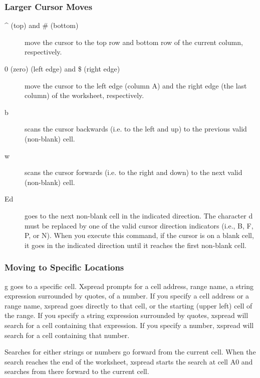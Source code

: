 \subsubsection*{Larger Cursor Moves}
\begin{description}
\item[ \^{ } (top) and \# (bottom)]{ move the cursor to the top row and bottom row of
the current column, respectively.}

    \item[0 (zero) (left edge) and \$ (right edge)]{ move the cursor to the left edge
(column A) and the right edge (the last column) of the worksheet, 
respectively.}

    \item[b]{ scans the cursor backwards (i.e. to the left and up) to the previous 
valid (non-blank) cell.}

    \item[w]{ scans the cursor forwards (i.e. to the right and down) to the next valid 
(non-blank) cell.}

    \item[\ctrl Ed]{ goes to the next non-blank cell in the indicated direction.  The 
character d must be replaced by one of the valid cursor direction indicators 
(i.e., \ctrl B, \ctrl F, \ctrl P, or \ctrl N).  When you execute this 
  command, if the cursor is on 
a blank cell, it goes in the indicated direction until it reaches the first 
non-blank cell.}
\end{description}

\subsubsection*{Moving to Specific Locations}

    g goes to a specific cell.  Xspread prompts for a cell address, range 
name, a string expression surrounded by quotes, of a number.  If you specify a 
cell address or a range name, xspread goes directly to that cell, or the 
starting (upper left) cell of the range.  If you specify a string expression 
surrounded by quotes, xspread will search for a cell containing that 
expression.  If you specify a number, xspread will search for a cell 
containing that number.

    Searches for either strings or numbers go forward from the current cell.  
When the search reaches the end of the worksheet, xspread starts the search at 
cell A0 and searches from there forward to the current cell.

